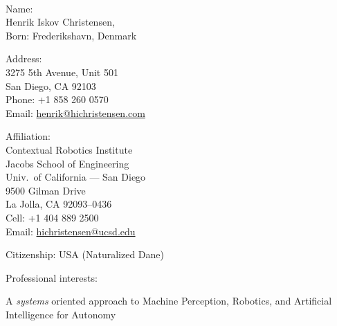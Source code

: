 \documentclass{article}
\begin{document}
\begin{cv}


	\noindent
	\begin{cvlist}{~}
		\item[Name:]\ \\
		Henrik Iskov Christensen,\\
		Born: Frederikshavn, Denmark\\
		\item[Address:]\ \\
		3275 5th Avenue, Unit 501\\
		San Diego, CA 92103\\
		Phone: +1 858 260 0570\\
		Email: \url{henrik@hichristensen.com}\\
		\item[Affiliation:]\ \\
		Contextual Robotics Institute\\
		Jacobs School of Engineering\\
		Univ.~of California --- San Diego\\
		9500 Gilman Drive\\
		La Jolla, CA 92093--0436\\
		Cell: +1 404 889 2500\\
		Email: \url{hichristensen@ucsd.edu}\\
		\item[Citizenship:] USA (Naturalized Dane)
	\end{cvlist}

	\begin{cvlist}{Professional interests:}
		\item A {\em systems}\/ oriented approach to Machine Perception,
		Robotics, and Artificial Intelligence for Autonomy
	\end{cvlist}




\end{cv}
\end{document}
